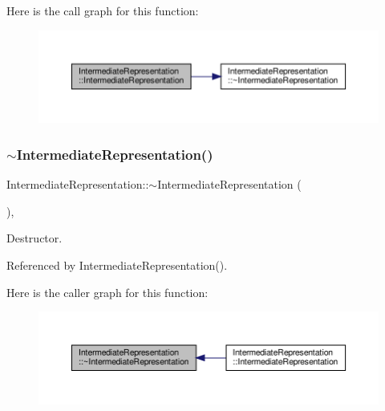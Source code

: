 Here is the call graph for this function\+:
\nopagebreak
\begin{figure}[H]
\begin{center}
\leavevmode
\includegraphics[width=350pt]{d7/dfa/classIntermediateRepresentation_adf706cd60d98eb7f72ec013d2adccc2f_cgraph}
\end{center}
\end{figure}
\mbox{\label{classIntermediateRepresentation_a8a513246a40ce403a30d538e54cb0945}} 
\subsubsection{\texorpdfstring{$\sim$\+Intermediate\+Representation()}{~IntermediateRepresentation()}}
{\footnotesize\ttfamily Intermediate\+Representation\+::$\sim$\+Intermediate\+Representation (\begin{DoxyParamCaption}{ }\end{DoxyParamCaption})\hspace{0.3cm}{\ttfamily [virtual]}, {\ttfamily [default]}}



Destructor. 



Referenced by Intermediate\+Representation().

Here is the caller graph for this function\+:
\nopagebreak
\begin{figure}[H]
\begin{center}
\leavevmode
\includegraphics[width=350pt]{d7/dfa/classIntermediateRepresentation_a8a513246a40ce403a30d538e54cb0945_icgraph}
\end{center}
\end{figure}


